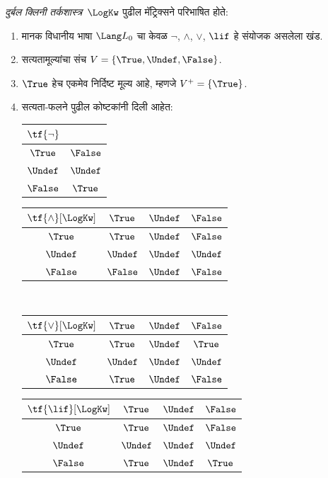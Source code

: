 \begin{defn}
\emph{दुर्बल क्लिनी तर्कशास्त्र}~$\LogKw$ पुढील मॅट्रिक्सने
परिभाषित होते:
\begin{enumerate}
  \item मानक विधानीय भाषा $\Lang L_0$ चा केवळ
  $\lnot$, $\land$, $\lor$, $\lif$ हे संयोजक असलेला खंड.
  \item सत्यतामूल्यांचा संच $V = \{\True, \Undef, \False\}$.
  \item $\True$ हेच एकमेव निर्दिष्ट मूल्य आहे, म्हणजे $V^+ = \{\True\}$.
  \item सत्यता-फलने पुढील कोष्टकांनी दिली आहेत:
  \begin{center}
    \begin{tabular}{c|c}
      $\tf{\lnot}$ & \\
      \hline
      $\True$ & $\False$ \\
      $\Undef$ & $\Undef$ \\
      $\False$ & $\True$
    \end{tabular}
    \quad
    \begin{tabular}{c|ccc}
      $\tf{\land}[\LogKw]$ & $\True$ & $\Undef$ & $\False$ \\
      \hline
      $\True$ & $\True$ & $\Undef$ & $\False$ \\
      $\Undef$ & $\Undef$ & $\Undef$ & $\Undef$\\
      $\False$ & $\False$ & $\Undef$ & $\False$
    \end{tabular}
    \\[2ex]
    \begin{tabular}{c|ccc}
      $\tf{\lor}[\LogKw]$ & $\True$ & $\Undef$ & $\False$ \\
      \hline
      $\True$ & $\True$ & $\Undef$ & $\True$ \\
      $\Undef$ & $\Undef$ & $\Undef$ & $\Undef$ \\
      $\False$ & $\True$ & $\Undef$ & $\False$
    \end{tabular}
    \quad
    \begin{tabular}{c|ccc}
      $\tf{\lif}[\LogKw]$ & $\True$ & $\Undef$ & $\False$ \\
      \hline
      $\True$ & $\True$ & $\Undef$ & $\False$ \\
      $\Undef$ & $\Undef$ & $\Undef$ & $\Undef$  \\
      $\False$ & $\True$ & $\Undef$ & $\True$
    \end{tabular}
  \end{center}
\end{enumerate}
\end{defn}
